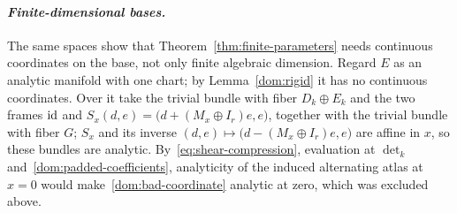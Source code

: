 \paragraph{\textit{Finite-dimensional bases.}}
The same spaces show that Theorem~\ref{thm:finite-parameters} needs continuous coordinates on the base,
not only finite algebraic dimension. Regard $E$ as an analytic manifold with one chart; by Lemma~\ref{dom:rigid} it has no
continuous coordinates. Over it take the trivial bundle with fiber $D_k\oplus E_k$ and the two frames
$\mathrm{id}$ and $S_x(d,e)=\bigl(d+(M_x\oplus I_r)e,e\bigr)$, together with the trivial bundle with fiber $G$;
$S_x$ and its inverse $(d,e)\mapsto\bigl(d-(M_x\oplus I_r)e,e\bigr)$ are affine in $x$, so these bundles
are analytic. By~\eqref{eq:shear-compression}, evaluation at $\det_k$
and~\eqref{dom:padded-coefficients}, analyticity of the induced alternating atlas at $x=0$ would
make~\eqref{dom:bad-coordinate} analytic at zero, which was excluded above.
